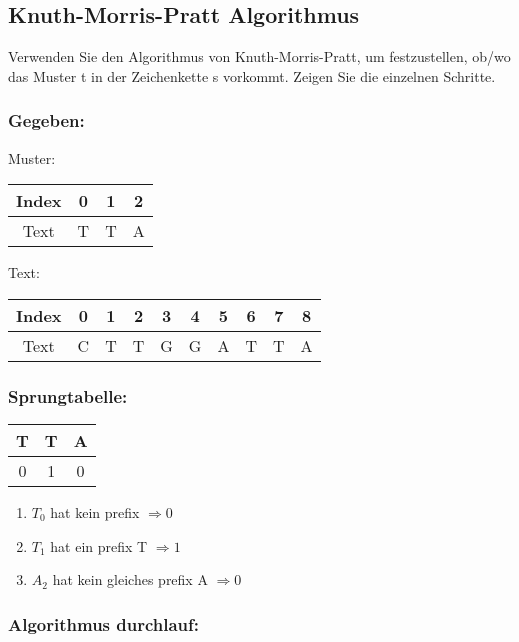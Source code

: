 \subsection{Knuth-Morris-Pratt Algorithmus}
Verwenden Sie den Algorithmus von Knuth-Morris-Pratt, um festzustellen,
ob/wo das Muster t in der Zeichenkette s vorkommt.
Zeigen Sie die einzelnen Schritte.

\subsubsection{Gegeben:}
Muster:\\
\begin{tabular}{|c|c|c|c|}
	\hline
	Index & 0 & 1 & 2 \\
	\hline
	Text & T & T & A \\
	\hline
\end{tabular}

\vspace{1em}

\noindent
Text:\\
\begin{tabular}{|c|c|c|c|c|c|c|c|c|c|}
	\hline
	Index & 0 & 1 & 2 & 3 & 4 & 5 & 6 & 7 & 8 \\
	\hline
	Text & C & T & T & G & G & A & T & T & A \\
	\hline
\end{tabular}

\subsubsection{Sprungtabelle:}

\begin{tabular}{|c|c|c|}
	\hline
	T & T & A \\
	\hline
	0 & 1 & 0 \\
	\hline
\end{tabular}

\begin{enumerate}
	\item $T_0$ hat kein prefix $\Rightarrow 0$
	\item $T_1$ hat ein prefix T $\Rightarrow 1$
	\item $A_2$ hat kein gleiches prefix A $\Rightarrow 0$
\end{enumerate}

\subsubsection{Algorithmus durchlauf:}

